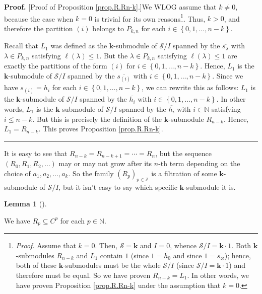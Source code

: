 \documentclass[numbers=enddot,12pt,final,onecolumn,notitlepage]{scrartcl}%
\theoremstyle{definition}
\newtheorem{lem}[theo]{Lemma}
\newenvironment{lemma}[1][]
{\begin{lem}[#1]\begin{leftbar}}
{\end{leftbar}\end{lem}}
\newenvironment{proof}[1][Proof]{\noindent\textbf{#1.} }{\ \rule{0.5em}{0.5em}}
\begin{document}
\begin{proof}
[Proof of Proposition \ref{prop.R.Rn-k}.]We WLOG assume that $k\neq0$, because
the case when $k=0$ is trivial for its own reasons\footnote{\textit{Proof.}
Assume that $k=0$. Then, $\mathcal{S}=\mathbf{k}$ and $I=0$, whence
$\mathcal{S}/I=\mathbf{k}\cdot1$. Both $\mathbf{k}$-submodules $R_{n-k}$ and
$L_{1}$ contain $1$ (since $1=\overline{h_{0}}$ and since $1=\overline
{s_{\varnothing}}$); hence, both of these $\mathbf{k}$-submodules must be the
whole $\mathcal{S}/I$ (since $\mathcal{S}/I=\mathbf{k}\cdot1$) and therefore
must be equal. So we have proven $R_{n-k}=L_{1}$. In other words, we have
proven Proposition \ref{prop.R.Rn-k} under the assumption that $k=0$.}. Thus,
$k>0$, and therefore the partition $\left(  i\right)  $ belongs to $P_{k,n}$
for each $i\in\left\{  0,1,\ldots,n-k\right\}  $.

Recall that $L_{1}$ was defined as the $\mathbf{k}$-submodule of
$\mathcal{S}/I$ spanned by the $\overline{s_{\lambda}}$ with $\lambda\in
P_{k,n}$ satisfying $\ell\left(  \lambda\right)  \leq1$. But the $\lambda\in
P_{k,n}$ satisfying $\ell\left(  \lambda\right)  \leq1$ are exactly the
partitions of the form $\left(  i\right)  $ for $i\in\left\{  0,1,\ldots
,n-k\right\}  $. Hence, $L_{1}$ is the $\mathbf{k}$-submodule of
$\mathcal{S}/I$ spanned by the $\overline{s_{\left(  i\right)  }}$ with
$i\in\left\{  0,1,\ldots,n-k\right\}  $. Since we have $s_{\left(  i\right)
}=h_{i}$ for each $i\in\left\{  0,1,\ldots,n-k\right\}  $, we can rewrite this
as follows: $L_{1}$ is the $\mathbf{k}$-submodule of $\mathcal{S}/I$ spanned
by the $\overline{h_{i}}$ with $i\in\left\{  0,1,\ldots,n-k\right\}  $. In
other words, $L_{1}$ is the $\mathbf{k}$-submodule of $\mathcal{S}/I$ spanned
by the $\overline{h_{i}}$ with $i\in\mathbb{N}$ satisfying $i\leq n-k$. But
this is precisely the definition of the $\mathbf{k}$-submodule $R_{n-k}$.
Hence, $L_{1}=R_{n-k}$. This proves Proposition \ref{prop.R.Rn-k}.
\end{proof}

It is easy to see that $R_{n-k}=R_{n-k+1}=\cdots=R_{n}$, but the sequence
$\left(  R_{0},R_{1},R_{2},\ldots\right)  $ may or may not grow after its
$n$-th term depending on the choice of $a_{1},a_{2},\ldots,a_{k}$. So the
family $\left(  R_{p}\right)  _{p\in\mathbb{Z}}$ is a filtration of some
$\mathbf{k}$-submodule of $\mathcal{S}/I$, but it isn't easy to say which
specific $\mathbf{k}$-submodule it is.

\begin{lemma}
\label{lem.R.Cp}We have $R_{p}\subseteq C^{p}$ for each $p\in\mathbb{N}$.
\end{lemma}
\end{document}
